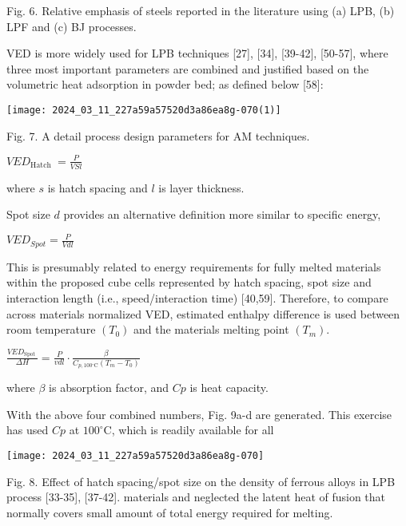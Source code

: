 \documentclass[10pt]{article}
\begin{document}
Fig. 6. Relative emphasis of steels reported in the literature using (a) LPB, (b) LPF and (c) BJ processes.

VED is more widely used for LPB techniques [27], [34], [39-42], [50-57], where three most important parameters are combined and justified based on the volumetric heat adsorption in powder bed; as defined below [58]:

\begin{center}
\texttt{[image: 2024\_03\_11\_227a59a57520d3a86ea8g-070(1)]}
\end{center}

Fig. 7. A detail process design parameters for AM techniques.

$V E D_{\text {Hatch }}=\frac{P}{V S l}$

where $s$ is hatch spacing and $l$ is layer thickness.

Spot size $d$ provides an alternative definition more similar to specific energy,

$V E D_{S p o t}=\frac{P}{V d l}$

This is presumably related to energy requirements for fully melted materials within the proposed cube cells represented by hatch spacing, spot size and interaction length (i.e., speed/interaction time) [40,59]. Therefore, to compare across materials normalized VED, estimated enthalpy difference is used between room temperature $\left(T_{0}\right)$ and the materials melting point $\left(T_{m}\right)$.

$\frac{V E D_{\text {Spot }}}{\Delta H}=\frac{P}{v d l} \cdot \frac{\beta}{C_{p, 100{ }^{\circ} \mathrm{C}}\left(T_{m}-T_{0}\right)}$

where $\beta$ is absorption factor, and $C p$ is heat capacity.

With the above four combined numbers, Fig. 9a-d are generated. This exercise has used $C p$ at $100^{\circ} \mathrm{C}$, which is readily available for all

\begin{center}
\texttt{[image: 2024\_03\_11\_227a59a57520d3a86ea8g-070]}
\end{center}

Fig. 8. Effect of hatch spacing/spot size on the density of ferrous alloys in LPB process [33-35], [37-42]. materials and neglected the latent heat of fusion that normally covers small amount of total energy required for melting.
\end{document}
